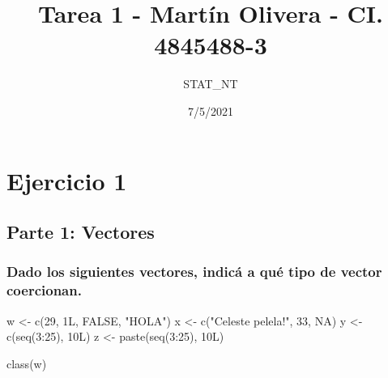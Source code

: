 \documentclass[
]{article}
\title{Tarea 1 - Martín Olivera - CI. 4845488-3}
\author{STAT\_NT}
\date{7/5/2021}
\newenvironment{Shaded}{\begin{snugshade}}{\end{snugshade}}
\newcommand{\ConstantTok}[1]{\textcolor[rgb]{0.00,0.00,0.00}{#1}}
\newcommand{\DecValTok}[1]{\textcolor[rgb]{0.00,0.00,0.81}{#1}}
\newcommand{\FunctionTok}[1]{\textcolor[rgb]{0.00,0.00,0.00}{#1}}
\newcommand{\NormalTok}[1]{#1}
\newcommand{\OtherTok}[1]{\textcolor[rgb]{0.56,0.35,0.01}{#1}}
\newcommand{\SpecialCharTok}[1]{\textcolor[rgb]{0.00,0.00,0.00}{#1}}
\newcommand{\StringTok}[1]{\textcolor[rgb]{0.31,0.60,0.02}{#1}}
\begin{document}
\maketitle

\newcommand{\bs}[1]{\boldsymbol{#1}}
\newcommand{\E}{\bs{\mathcal{E}}}
\newcommand{\F}{\bs{\mathcal{F}}}
\renewcommand{\v}{\bs{v}}
\renewcommand{\bfdefault}{m}

\hypertarget{ejercicio-1}{%
\section{Ejercicio 1}\label{ejercicio-1}}

\hypertarget{parte-1-vectores}{%
\subsection{Parte 1: Vectores}\label{parte-1-vectores}}

\hypertarget{dado-los-siguientes-vectores-indicuxe1-a-quuxe9-tipo-de-vector-coercionan.}{%
\subsubsection{Dado los siguientes vectores, indicá a qué tipo de vector
coercionan.}\label{dado-los-siguientes-vectores-indicuxe1-a-quuxe9-tipo-de-vector-coercionan.}}

\begin{Shaded}
\begin{Highlighting}[]
\NormalTok{w }\OtherTok{\textless{}{-}} \FunctionTok{c}\NormalTok{(}\DecValTok{29}\NormalTok{, 1L, }\ConstantTok{FALSE}\NormalTok{, }\StringTok{"HOLA"}\NormalTok{)}
\NormalTok{x }\OtherTok{\textless{}{-}} \FunctionTok{c}\NormalTok{(}\StringTok{"Celeste pelela!"}\NormalTok{, }\DecValTok{33}\NormalTok{, }\ConstantTok{NA}\NormalTok{)}
\NormalTok{y }\OtherTok{\textless{}{-}} \FunctionTok{c}\NormalTok{(}\FunctionTok{seq}\NormalTok{(}\DecValTok{3}\SpecialCharTok{:}\DecValTok{25}\NormalTok{), 10L)}
\NormalTok{z }\OtherTok{\textless{}{-}} \FunctionTok{paste}\NormalTok{(}\FunctionTok{seq}\NormalTok{(}\DecValTok{3}\SpecialCharTok{:}\DecValTok{25}\NormalTok{), 10L)}
\end{Highlighting}
\end{Shaded}

\begin{Shaded}
\begin{Highlighting}[]
\FunctionTok{class}\NormalTok{(w)}
\end{Highlighting}
\end{Shaded}
\end{document}

